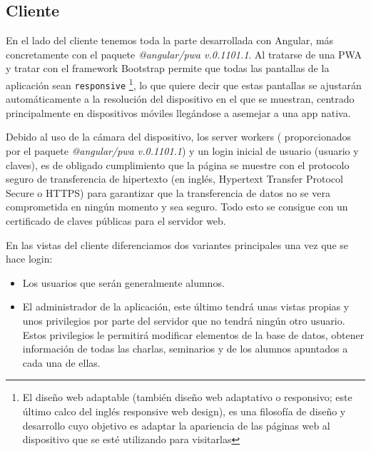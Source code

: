 \documentclass[a4paper, 12pt]{book}
\begin{document}
\subsection{Cliente}
	En el lado del cliente tenemos toda la parte desarrollada con Angular, más concretamente con el paquete \textit{@angular/pwa v.0.1101.1}. Al tratarse de una PWA y tratar con el framework Bootstrap permite que todas las pantallas de la aplicación sean \texttt{responsive} \footnote{El diseño web adaptable (también diseño web adaptativo o responsivo; este último calco del inglés responsive web design), es una filosofía de diseño y desarrollo cuyo objetivo es adaptar la apariencia de las páginas web al dispositivo que se esté utilizando para visitarlas}, lo que quiere decir que estas pantallas se ajustarán automáticamente a la resolución del dispositivo en el que se muestran, centrado principalmente en dispositivos móviles llegándose a asemejar a una app nativa.
	
	Debido al uso de la cámara del dispositivo, los server workers ( proporcionados por el paquete \textit{@angular/pwa v.0.1101.1}) y un login inicial de usuario (usuario y claves), es de obligado cumplimiento que la página se muestre con el protocolo seguro de transferencia de hipertexto (en inglés, Hypertext Transfer Protocol Secure o HTTPS) para garantizar que la transferencia de datos no se vera comprometida en ningún momento y sea seguro. Todo esto se consigue con un certificado de claves públicas para el servidor web.
	
	En las vistas del cliente diferenciamos dos variantes principales una vez que se hace login: 
	\begin{itemize}
  \item Los usuarios que serán generalmente alumnos.
  \item El administrador de la aplicación, este último tendrá unas vistas propias y unos privilegios por parte del servidor que no tendrá ningún otro usuario. Estos privilegios le permitirá modificar elementos de la base de datos, obtener información de todas las charlas, seminarios y de los alumnos apuntados a cada una de ellas.
\end{itemize}

	
\end{document}
